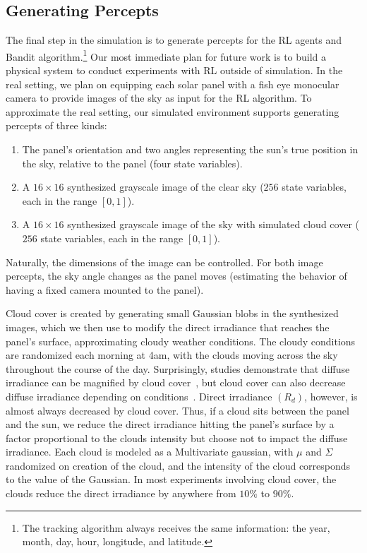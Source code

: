 \documentclass{article}
\begin{document}
{%
\subsection{Generating Percepts}

The final step in the simulation is to generate percepts for the RL agents and Bandit algorithm.\footnote{The tracking algorithm always receives the same information: the year, month, day, hour, longitude, and latitude.} Our most immediate plan for future work is to build a physical system to conduct experiments with RL outside of simulation. In the real setting, we plan on equipping each solar panel with a fish eye monocular camera to provide images of the sky as input for the RL algorithm. To approximate the real setting, our simulated environment supports generating percepts of three kinds:
\begin{enumerate}
\item The panel's orientation and two angles representing the sun's true position in the sky, relative to the panel (four state variables).
\item A $16 \times 16$ synthesized grayscale image of the clear sky ($256$ state variables, each in the range $[0,1]$).
\item A $16\times 16$ synthesized grayscale image of the sky with simulated cloud cover ($256$ state variables, each in the range $[0,1]$).
\end{enumerate}
Naturally, the dimensions of the image can be controlled. For both image percepts, the sky angle changes as the panel moves (estimating the behavior of having a fixed camera mounted to the panel).

Cloud cover is created by generating small Gaussian blobs in the synthesized images, which we then use to modify the direct irradiance that reaches the panel's surface, approximating cloudy weather conditions. The cloudy conditions are randomized each morning at 4am, with the clouds moving across the sky throughout the course of the day. Surprisingly, studies demonstrate that diffuse irradiance can be magnified by cloud cover~\cite{robinson1966solar}, but cloud cover can also decrease diffuse irradiance depending on conditions~\cite{pfister2003cloud}. Direct irradiance $(R_d)$, however, is almost always decreased by cloud cover. Thus, if a cloud sits between the panel and the sun, we reduce the direct irradiance hitting the panel's surface by a factor proportional to the clouds intensity but choose not to impact the diffuse irradiance. Each cloud is modeled as a Multivariate gaussian, with $\mu$ and $\Sigma$ randomized on creation of the cloud, and the intensity of the cloud corresponds to the value of the Gaussian. In most experiments involving cloud cover, the clouds reduce the direct irradiance by anywhere from $10\%$ to $90\%$.

}
\end{document}
